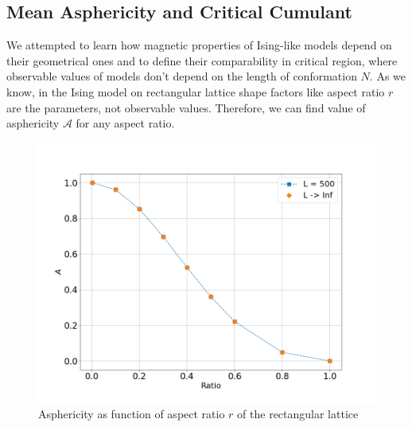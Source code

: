 \documentclass[aps,pre,amssymb,amsmath,twocolumn,floatfix]{revtex4-2}
\begin{document}
\subsection{Mean Asphericity and Critical Cumulant}



We attempted to learn how magnetic properties of Ising-like models depend on their geometrical ones and to define their comparability in critical region, where observable values of models don't depend on the length of conformation $N$. As we know, in the Ising model on rectangular lattice shape factors like aspect ratio $r$ are the parameters, not observable values. Therefore, we can find value of asphericity $\mathcal{A}$ for any aspect ratio.

\begin{figure}[h]
    \centering
    \includegraphics[width=\columnwidth]{Images/A_r.png}
    \caption{Asphericity as function of aspect ratio $r$ of the rectangular lattice}
    \label{fig:A_r}
\end{figure}

\end{document}
